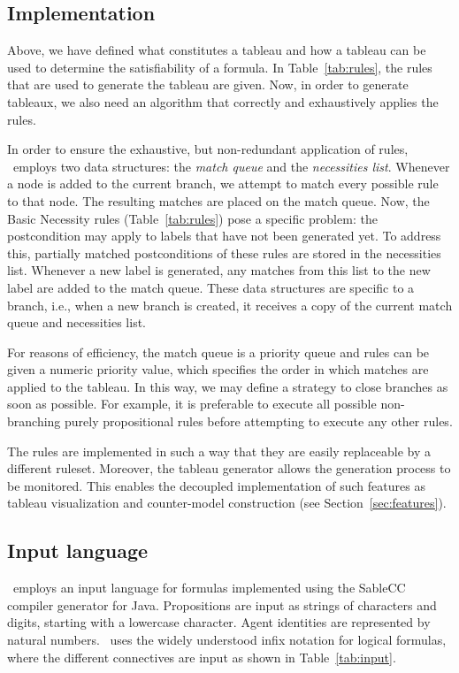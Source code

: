 \subsection{Implementation}
\label{sec:implementation}

Above, we have defined what constitutes a tableau and how a tableau can be used
to determine the satisfiability of a formula. In Table~\ref{tab:rules}, the
rules that are used to generate the tableau are given. Now, in order to
generate tableaux, we also need an algorithm that correctly and exhaustively
applies the rules.

In order to ensure the exhaustive, but non-redundant application of rules,
\oops\ employs two data structures: the {\em match queue} and the {\em
necessities list}.
Whenever a node is added to the current branch, we attempt to match every
possible
rule to that node. The resulting matches are placed on the match queue. Now,
the Basic Necessity rules (Table~\ref{tab:rules}) pose a specific problem:
the postcondition may apply to labels that have not been generated yet. To
address this, partially matched postconditions of these rules are stored in
the necessities list. Whenever a new label is generated, any matches from this
list to the new label are added to the match queue.
These data structures are specific to a branch, i.e., when
a new branch is created, it receives a copy of the current match queue and
necessities list.

For reasons of efficiency,
the match queue is a priority queue and rules can be given a numeric
priority value, which specifies the order in which matches are applied to the
tableau. In this way, we may define a strategy to close branches as soon as
possible. For example, it is preferable to execute all possible non-branching
purely propositional rules before attempting to execute any other rules.

The rules are implemented in such a way that they are easily replaceable by a
different ruleset.
Moreover, the tableau generator allows the generation process to be monitored.
This enables the decoupled implementation of such features as tableau
visualization and counter-model construction (see Section~\ref{sec:features}).

\subsection{Input language}
\label{sec:language}

\oops\ employs an input language for formulas implemented using the SableCC
\citep{gagnon1998} compiler generator for Java. Propositions are input as
strings of characters and digits, starting with a lowercase character.  Agent
identities are represented by natural numbers. \oops\ uses the widely
understood infix notation for logical formulas, where the different
connectives are input as shown in Table~\ref{tab:input}.

